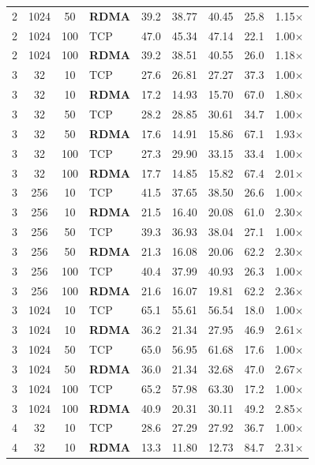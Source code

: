 \documentclass[11pt,a4paper]{article}
\begin{document}
{\begin{longtable}{@{}ccclrrrrr@{}}
2 & 1024 & 50 & \textbf{RDMA} & 39.2 & 38.77 & 40.45 & 25.8 & 1.15$\times$ \\
2 & 1024 & 100 & TCP & 47.0 & 45.34 & 47.14 & 22.1 & 1.00$\times$ \\
2 & 1024 & 100 & \textbf{RDMA} & 39.2 & 38.51 & 40.55 & 26.0 & 1.18$\times$ \\
\midrule
3 & 32 & 10 & TCP & 27.6 & 26.81 & 27.27 & 37.3 & 1.00$\times$ \\
3 & 32 & 10 & \textbf{RDMA} & 17.2 & 14.93 & 15.70 & 67.0 & 1.80$\times$ \\
3 & 32 & 50 & TCP & 28.2 & 28.85 & 30.61 & 34.7 & 1.00$\times$ \\
3 & 32 & 50 & \textbf{RDMA} & 17.6 & 14.91 & 15.86 & 67.1 & 1.93$\times$ \\
3 & 32 & 100 & TCP & 27.3 & 29.90 & 33.15 & 33.4 & 1.00$\times$ \\
3 & 32 & 100 & \textbf{RDMA} & 17.7 & 14.85 & 15.82 & 67.4 & 2.01$\times$ \\
\midrule
3 & 256 & 10 & TCP & 41.5 & 37.65 & 38.50 & 26.6 & 1.00$\times$ \\
3 & 256 & 10 & \textbf{RDMA} & 21.5 & 16.40 & 20.08 & 61.0 & 2.30$\times$ \\
3 & 256 & 50 & TCP & 39.3 & 36.93 & 38.04 & 27.1 & 1.00$\times$ \\
3 & 256 & 50 & \textbf{RDMA} & 21.3 & 16.08 & 20.06 & 62.2 & 2.30$\times$ \\
3 & 256 & 100 & TCP & 40.4 & 37.99 & 40.93 & 26.3 & 1.00$\times$ \\
3 & 256 & 100 & \textbf{RDMA} & 21.6 & 16.07 & 19.81 & 62.2 & 2.36$\times$ \\
\midrule
3 & 1024 & 10 & TCP & 65.1 & 55.61 & 56.54 & 18.0 & 1.00$\times$ \\
3 & 1024 & 10 & \textbf{RDMA} & 36.2 & 21.34 & 27.95 & 46.9 & 2.61$\times$ \\
3 & 1024 & 50 & TCP & 65.0 & 56.95 & 61.68 & 17.6 & 1.00$\times$ \\
3 & 1024 & 50 & \textbf{RDMA} & 36.0 & 21.34 & 32.68 & 47.0 & 2.67$\times$ \\
3 & 1024 & 100 & TCP & 65.2 & 57.98 & 63.30 & 17.2 & 1.00$\times$ \\
3 & 1024 & 100 & \textbf{RDMA} & 40.9 & 20.31 & 30.11 & 49.2 & 2.85$\times$ \\
\midrule
4 & 32 & 10 & TCP & 28.6 & 27.29 & 27.92 & 36.7 & 1.00$\times$ \\
4 & 32 & 10 & \textbf{RDMA} & 13.3 & 11.80 & 12.73 & 84.7 & 2.31$\times$ \\

\end{longtable}}
\end{document}
